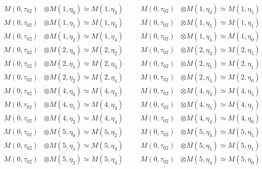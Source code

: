 \begin{align*}
M(0,\tau_{02}) &\otimes M(1,\eta_{0}) \simeq M(1,\eta_{2}) &&& M(0,\tau_{02}) &\otimes M(1,\eta_{3}) \simeq M(1,\eta_{5})\\
M(0,\tau_{02}) &\otimes M(1,\eta_{1}) \simeq M(1,\eta_{3}) &&& M(0,\tau_{02}) &\otimes M(1,\eta_{5}) \simeq M(1,\eta_{1})\\
M(0,\tau_{02}) &\otimes M(1,\eta_{2}) \simeq M(1,\eta_{4}) &&& M(0,\tau_{02}) &\otimes M(1,\eta_{4}) \simeq M(1,\eta_{0})\\
M(0,\tau_{02}) &\otimes M(2,\eta_{0}) \simeq M(2,\eta_{2}) &&& M(0,\tau_{02}) &\otimes M(2,\eta_{3}) \simeq M(2,\eta_{5})\\
M(0,\tau_{02}) &\otimes M(2,\eta_{1}) \simeq M(2,\eta_{3}) &&& M(0,\tau_{02}) &\otimes M(2,\eta_{5}) \simeq M(2,\eta_{1})\\
M(0,\tau_{02}) &\otimes M(2,\eta_{2}) \simeq M(2,\eta_{4}) &&& M(0,\tau_{02}) &\otimes M(2,\eta_{4}) \simeq M(2,\eta_{0})\\
M(0,\tau_{02}) &\otimes M(4,\eta_{0}) \simeq M(4,\eta_{2}) &&& M(0,\tau_{02}) &\otimes M(4,\eta_{3}) \simeq M(4,\eta_{5})\\
M(0,\tau_{02}) &\otimes M(4,\eta_{1}) \simeq M(4,\eta_{3}) &&& M(0,\tau_{02}) &\otimes M(4,\eta_{5}) \simeq M(4,\eta_{1})\\
M(0,\tau_{02}) &\otimes M(4,\eta_{2}) \simeq M(4,\eta_{4}) &&& M(0,\tau_{02}) &\otimes M(4,\eta_{4}) \simeq M(4,\eta_{0})\\
M(0,\tau_{02}) &\otimes M(5,\eta_{0}) \simeq M(5,\eta_{2}) &&& M(0,\tau_{02}) &\otimes M(5,\eta_{3}) \simeq M(5,\eta_{5})\\
M(0,\tau_{02}) &\otimes M(5,\eta_{1}) \simeq M(5,\eta_{3}) &&& M(0,\tau_{02}) &\otimes M(5,\eta_{5}) \simeq M(5,\eta_{1})\\
M(0,\tau_{02}) &\otimes M(5,\eta_{2}) \simeq M(5,\eta_{4}) &&& M(0,\tau_{02}) &\otimes M(5,\eta_{4}) \simeq M(5,\eta_{0})\\
\end{align*}

